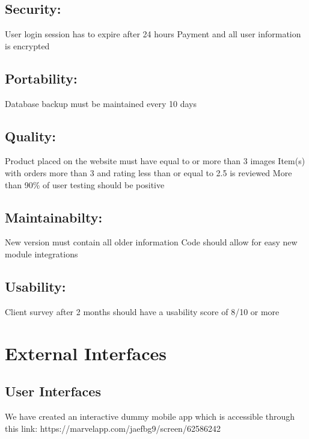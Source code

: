 \subsection*{Security:}
\begin{outline}
    \1 User login session has to expire after 24 hours
    \1 Payment and all user information is encrypted
\end{outline}

\subsection*{Portability:}
\begin{outline}
    \1 Database backup must be maintained every 10 days
\end{outline}

\subsection*{Quality:}
\begin{outline}
    \1 Product placed on the website must have equal to or more than 3 images
    \1 Item(s) with orders more than 3 and rating less than or equal to 2.5 is reviewed
    \1 More than 90\% of user testing should be positive 
\end{outline}

\subsection*{Maintainabilty:}
\begin{outline}
    \1 New version must contain all older information
    \1 Code should allow for easy new module integrations
\end{outline}

\subsection*{Usability:}
\begin{outline}
    \1 Client survey after 2 months should have a usability score of 8/10 or more
\end{outline}

\section{External Interfaces}

\subsection{User Interfaces}
We have created an interactive dummy mobile app which is accessible through this link: https://marvelapp.com/jaefbg9/screen/62586242

